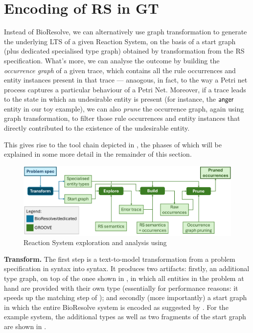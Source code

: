 
\section{Encoding of RS in GT}\label{sec:RS2GTS}

Instead of BioResolve, we can alternatively use graph transformation to generate the underlying LTS of a given Reaction System, on the basis of a start graph (plus dedicated specialised type graph) obtained by transformation from the RS specification. What's more, we can analyse the outcome by building the \emph{occurrence graph} of a given trace, which contains all the rule occurrences and entity instances present in that trace --- anaogous, in fact, to the way a Petri net process captures a particular behaviour of a Petri Net. Moreover, if a trace leads to the state in which an undesirable entity is present (for instance, the ${\text{\sffamily anger}}$ entity in our toy example), we can also \emph{prune} the occurrence graph, again using graph transformation, to filter those rule occurrences and entity instances that directly contributed to the existence of the undesirable entity.

This gives rise to the tool chain depicted in , the phases of which will be explained in some more detail in the remainder of this section.	

\begin{figure}
\centering
\includegraphics[scale=.25]{figs/chain}
\caption{Reaction System exploration and analysis using \GROOVE}
\label{fig:chain}
\end{figure}

\medskip\noindent\textbf{Transform.}
%
The first step is a text-to-model transformation from a problem specification in \BioResolve syntax into \GROOVE syntax. It produces two artifacts: firstly, an additional type graph, on top of the onee shown in , in which all entities in the problem at hand are provided with their own type (essentially for performance reasons: it speeds up the matching step of \GROOVE); and secondly (more importantly) a start graph in which the entire BioResolve system is encoded as suggested by . For the example system, the additional types as well as two fragments of the start graph are shown in .

